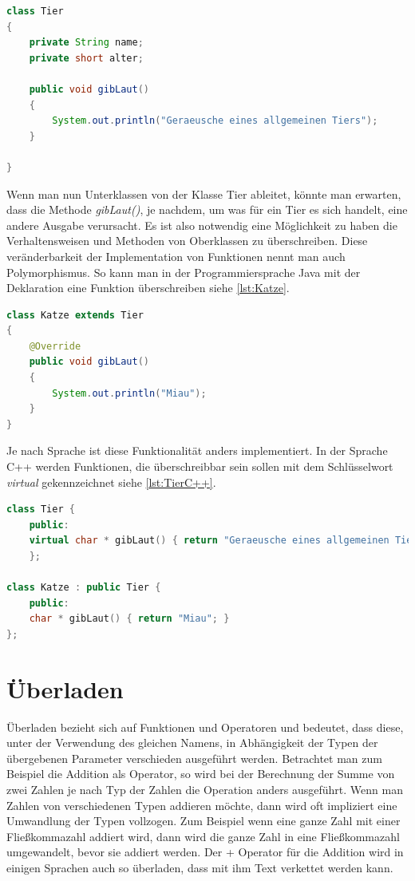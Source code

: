 \documentclass[
	12pt, %
	a4paper,
	listof=totoc, %
	bibliography=totoc, %
	numbers=noenddot, %
	ngerman, %
	headsepline, %
	oneside %
	]{scrbook} %
\begin{document}
\begin{lstlisting}[language=Java, caption=Klasse Tier, label={lst:Tier}]
class Tier
{
    private String name;
    private short alter;
 
    public void gibLaut()
    {
        System.out.println("Geraeusche eines allgemeinen Tiers");
    }

}
\end{lstlisting}

Wenn man nun Unterklassen von der Klasse Tier ableitet, könnte man erwarten, dass die Methode \emph{gibLaut()}, je nachdem, um was für ein Tier es sich handelt, eine andere Ausgabe verursacht.  
Es ist also notwendig eine Möglichkeit zu haben die Verhaltensweisen und Methoden von Oberklassen zu überschreiben. Diese veränderbarkeit der Implementation von Funktionen nennt man auch Polymorphismus. 
So kann man in der Programmiersprache Java mit der Deklaration \emph{\@Override} eine Funktion überschreiben siehe \ref{lst:Katze}.

\begin{lstlisting}[language=Java, caption=Klasse Katze, label={lst:Katze}]
class Katze extends Tier
{
    @Override
    public void gibLaut()
    {
        System.out.println("Miau");
    }
}
\end{lstlisting}

Je nach Sprache ist diese Funktionalität anders implementiert. In der Sprache C++ werden Funktionen, die überschreibbar sein sollen mit dem Schlüsselwort \emph{virtual} gekennzeichnet siehe \ref{lst:TierC++}.

\begin{lstlisting}[language=C++, caption=Tier und Katzen Beispiel in C++, label={lst:TierC++}]
class Tier {
	public:
	virtual char * gibLaut() { return "Geraeusche eines allgemeinen Tiers"; }
	};
	
class Katze : public Tier {
	public:
	char * gibLaut() { return "Miau"; }
};
\end{lstlisting}

\section{Überladen}
Überladen bezieht sich auf Funktionen und Operatoren und bedeutet, dass diese, unter der Verwendung des gleichen Namens, in Abhängigkeit der Typen der übergebenen Parameter verschieden ausgeführt werden. Betrachtet man zum Beispiel die Addition als Operator, so wird bei der Berechnung der Summe von zwei Zahlen je nach Typ der Zahlen die Operation anders ausgeführt.  
Wenn man Zahlen von verschiedenen Typen addieren möchte, dann wird oft impliziert eine Umwandlung der Typen vollzogen. Zum Beispiel wenn eine ganze Zahl mit einer Fließkommazahl addiert wird, dann wird die ganze Zahl in eine Fließkommazahl umgewandelt, bevor sie addiert werden.  
Der + Operator für die Addition wird in einigen Sprachen auch so überladen, dass mit ihm Text verkettet werden kann.  
  
\end{document}
